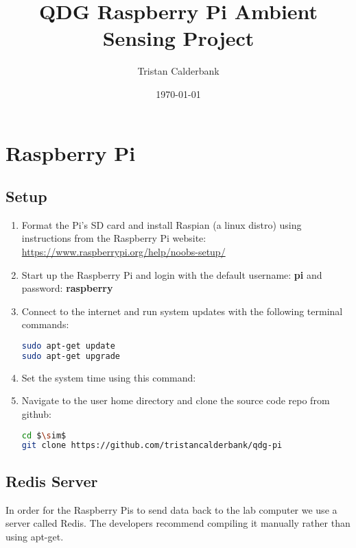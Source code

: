 \documentclass[a4paper,12pt]{article}
\title{QDG Raspberry Pi Ambient Sensing Project}
\date{\today}
\author{Tristan Calderbank}
\begin{document}
\maketitle
\tableofcontents
\newpage

\section{Raspberry Pi}

\subsection{Setup}

\sloppy
\begin{enumerate}

\item Format the Pi's SD card and install Raspian (a linux distro) using instructions from the Raspberry Pi website: \href{https://www.raspberrypi.org/help/noobs-setup/}{https://www.raspberrypi.org/help/noobs-setup/}
\item Start up the Raspberry Pi and login with the default username: \textbf{pi} and password: \textbf{raspberry}

\item Connect to the internet and run system updates with the following terminal commands:

\begin{lstlisting}[language=bash]
sudo apt-get update
sudo apt-get upgrade
\end{lstlisting}

\item Set the system time using this command:

\item Navigate to the user home directory and clone the source code repo from github:
\begin{lstlisting}[language=bash, mathescape]
cd $\sim$
git clone https://github.com/tristancalderbank/qdg-pi
\end{lstlisting}


\end{enumerate}

\subsection{Redis Server}

In order for the Raspberry Pis to send data back to the lab computer we use a server called Redis. The developers recommend compiling it manually rather than using apt-get.
\end{document}

